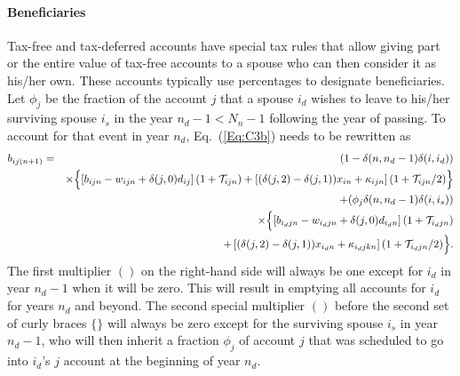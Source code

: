 \documentclass{report}[fleqn,12pt]
\begin{document}
\paragraph*{Beneficiaries}
Tax-free and tax-deferred accounts have special tax rules that allow giving part
or the entire value of
tax-free accounts to a spouse who can then consider it as his/her own.
These accounts typically use percentages to designate beneficiaries.
Let $\phi_j$ be the fraction of the account $j$ that a spouse $i_d$ wishes
to leave to his/her surviving spouse $i_s$
in the year $n_d  - 1 < N_n - 1$ following the year of passing. 
To account for that event in year $n_d$, Eq.~(\ref{Eq:C3b}) needs to be rewritten as
\begin{eqnarray}
	b_{ij(n+1)} &=& (1 - \delta(n, n_d-1)\delta(i, i_d)) \nonumber \\
	&&\times \Bigl\{\left[b_{ijn} - w_{ijn} + \delta(j, 0)d_{ij}\right](1 + \mathcal{T}_{ijn})
	+ \left[(\delta(j, 2) - \delta(j, 1))x_{in} + \kappa_{ijn}\right](1 + \mathcal{T}_{ijn}/2) 
	\Bigr\}\nonumber \\
	&& + (\phi_j\delta(n, n_d-1)\delta(i, i_s)) \nonumber  \\
	&& \times \Bigl\{\left[b_{i_djn} - w_{i_djn} + \delta(j, 0)d_{i_dn}\right](1 + \mathcal{T}_{i_djn})
	\nonumber\\
	&& + \left[(\delta(j, 2) - \delta(j, 1))x_{i_dn} + \kappa_{i_djkn}\right](1 + \mathcal{T}_{i_djn}/2) 
	\Bigr\}.
\end{eqnarray}
The first multiplier $()$ on the right-hand side will always be one except for $i_d$ in
year $n_d-1$ when it will be zero. This will result in emptying all accounts for $i_d$ for years
$n_d$ and beyond.
The second special multiplier $()$ before the second set of curly braces
$\{\}$ will always be zero except for the surviving
spouse $i_s$ in year $n_d-1$, who will then inherit a fraction $\phi_j$ of account $j$ that
was scheduled to go into $i_d$'s $j$ account at the beginning of year $n_d$.
\end{document}
